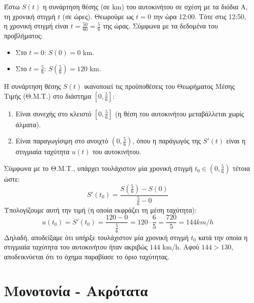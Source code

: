 \lysh
Έστω $S(t)$ η συνάρτηση θέσης (σε \si{km}) του αυτοκινήτου σε σχέση με τα διόδια A, τη χρονική στιγμή $t$ (σε ώρες).
Θεωρούμε ως $t=0$ την ώρα 12:00. Τότε στις 12:50, η χρονική στιγμή είναι $t = \frac{50}{60} = \frac{5}{6}$ της ώρας.
Σύμφωνα με τα δεδομένα του προβλήματος:
\begin{itemize}
\item Στο $t = 0$: $S(0) = 0$ \si{km}.
\item Στο $t = \frac{5}{6}$: $S\left(\frac{5}{6}\right) = 120$ \si{km}.
\end{itemize}
Η συνάρτηση θέσης $S(t)$ ικανοποιεί τις προϋποθέσεις του Θεωρήματος Μέσης Τιμής (Θ.Μ.Τ.) στο διάστημα $\left[0, \frac{5}{6}\right]$:
\begin{enumerate}
\item Είναι συνεχής στο κλειστό $\left[0, \frac{5}{6}\right]$ (η θέση του αυτοκινήτου μεταβάλλεται χωρίς άλματα).
\item Είναι παραγωγίσιμη στο ανοιχτό $\left(0, \frac{5}{6}\right)$, όπου η παράγωγός της $S'(t)$ είναι η στιγμιαία ταχύτητα $u(t)$ του αυτοκινήτου.
\end{enumerate}
Σύμφωνα με το Θ.Μ.Τ., υπάρχει τουλάχιστον μία χρονική στιγμή $t_0 \in \left(0, \frac{5}{6}\right)$ τέτοια ώστε:
\[ S'(t_0) = \frac{S\left(\frac{5}{6}\right) - S(0)}{\frac{5}{6} - 0} \]
Υπολογίζουμε αυτή την τιμή (η οποία εκφράζει τη μέση ταχύτητα):
\[ u(t_0) = S'(t_0) = \frac{120 - 0}{\frac{5}{6}} = 120 \cdot \frac{6}{5} = \frac{720}{5} = 144 \si{ km/h} \]
Δηλαδή, αποδείξαμε ότι υπήρξε τουλάχιστον μία χρονική στιγμή $t_0$ κατά την οποία η στιγμιαία ταχύτητα του αυτοκινήτου ήταν ακριβώς $144$ \si{km/h}. 
Αφού $144 > 130$, αποδεικνύεται ότι το όχημα παραβίασε το όριο ταχύτητας.

\section{Μονοτονία - Ακρότατα}

